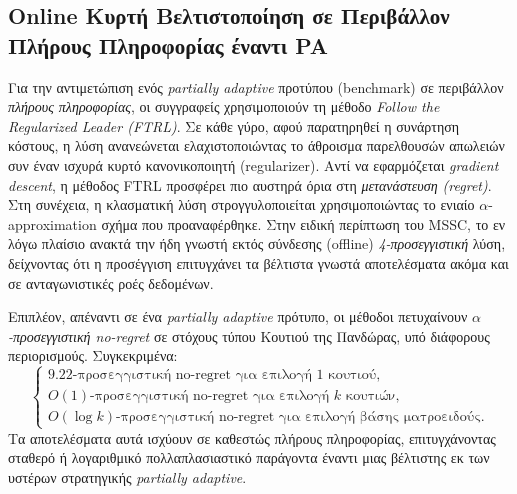 \documentclass[11pt,a4paper]{article}
\begin{document}
\subsection*{Online Κυρτή Βελτιστοποίηση σε Περιβάλλον Πλήρους Πληροφορίας έναντι PA}
Για την αντιμετώπιση ενός \textit{partially adaptive} προτύπου (benchmark) σε περιβάλλον \textit{πλήρους πληροφορίας}, οι συγγραφείς χρησιμοποιούν τη μέθοδο \textit{Follow the Regularized Leader (FTRL)}. Σε κάθε γύρο, αφού παρατηρηθεί η συνάρτηση κόστους, η λύση ανανεώνεται ελαχιστοποιώντας το άθροισμα παρελθουσών απωλειών συν έναν ισχυρά κυρτό κανονικοποιητή (regularizer). Αντί να εφαρμόζεται \textit{gradient descent}, η μέθοδος FTRL προσφέρει πιο αυστηρά όρια στη \textit{μετανάστευση (regret)}. Στη συνέχεια, η κλασματική λύση στρογγυλοποιείται χρησιμοποιώντας το ενιαίο $\alpha$-approximation σχήμα που προαναφέρθηκε. Στην ειδική περίπτωση του MSSC, το εν λόγω πλαίσιο ανακτά την ήδη γνωστή εκτός σύνδεσης (offline) \textit{4-προσεγγιστική} λύση, δείχνοντας ότι η προσέγγιση επιτυγχάνει τα βέλτιστα γνωστά αποτελέσματα ακόμα και σε ανταγωνιστικές ροές δεδομένων.

Επιπλέον, απέναντι σε ένα \textit{partially adaptive} πρότυπο, οι μέθοδοι πετυχαίνουν \textit{$\alpha$-προσεγγιστική no-regret} σε στόχους τύπου Κουτιού της Πανδώρας, υπό διάφορους περιορισμούς. Συγκεκριμένα:
\[
\begin{cases}
\text{9.22-προσεγγιστική no-regret για επιλογή 1 κουτιού},\\
O(1)\text{-προσεγγιστική no-regret για επιλογή $k$ κουτιών},\\
O(\log k)\text{-προσεγγιστική no-regret για επιλογή βάσης ματροειδούς}.
\end{cases}
\]
Τα αποτελέσματα αυτά ισχύουν σε καθεστώς πλήρους πληροφορίας, επιτυγχάνοντας σταθερό ή λογαριθμικό πολλαπλασιαστικό παράγοντα έναντι μιας βέλτιστης εκ των υστέρων στρατηγικής \textit{partially adaptive}.
\end{document}
